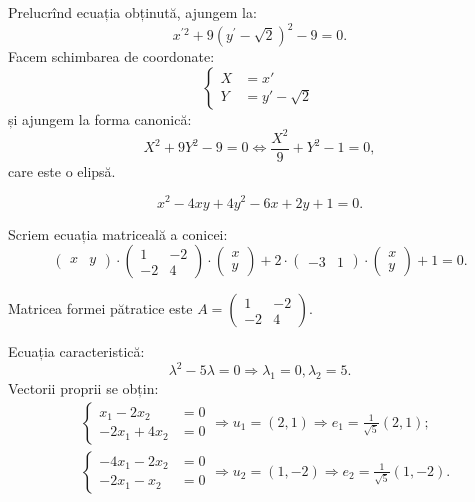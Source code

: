 \documentclass[11pt,a4paper]{article}
\theoremstyle{dotless}
\theoremstyle{dotlessdr}
\begin{document}
Prelucrînd ecuația obținută, ajungem la:
\[
  x^{\prime 2} + 9(y^\prime - \sqrt{2})^2 - 9 = 0.
\]
Facem schimbarea de coordonate:
\[
  \begin{cases}
    X &= x' \\
    Y &= y' - \sqrt{2}
  \end{cases}
\]
și ajungem la forma canonică:
\[
  X^2 + 9Y^2 - 9 = 0 \Leftrightarrow \frac{X^2}{9} + Y^2 - 1 = 0,
\]
care este o elipsă.

\vspace{1cm}

\[
  x^2 - 4xy + 4y^2 - 6x + 2y + 1 = 0.
\]

Scriem ecuația matriceală a conicei:
\[
  \begin{pmatrix}
    x & y
  \end{pmatrix} \cdot
  \begin{pmatrix}
    1 & -2 \\
    -2 & 4
  \end{pmatrix} \cdot
  \begin{pmatrix}
    x \\ y
  \end{pmatrix} + 2 \cdot
  \begin{pmatrix}
    -3 & 1  \end{pmatrix} \cdot
  \begin{pmatrix}
    x \\ y
  \end{pmatrix} + 1 = 0.
\]

Matricea formei pătratice este $A = \begin{pmatrix} 1 & -2 \\ -2 & 4 \end{pmatrix}$.

Ecuația caracteristică:
\[
  \lambda^2 - 5\lambda = 0 \Rightarrow \lambda_1 = 0, \lambda_2 = 5.
\]
Vectorii proprii se obțin:
\begin{align*}
  &\begin{cases}
    x_1 - 2x_2 &= 0 \\
    -2x_1 + 4x_2 &= 0
  \end{cases} \Rightarrow u_1 = (2, 1) \Rightarrow e_1 = \frac{1}{\sqrt{5}} (2, 1); \\
  & \begin{cases}
    -4x_1 - 2x_2 &= 0 \\
    -2x_1 - x_2 &= 0 
  \end{cases} \Rightarrow u_2 = (1, -2) \Rightarrow e_2 = \frac{1}{\sqrt{5}} (1, -2).
\end{align*}
\end{document}

